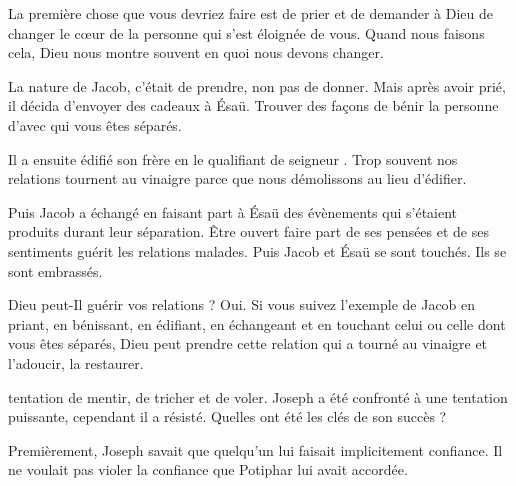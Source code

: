 
 La première chose que vous devriez faire est de prier et de demander
 à Dieu de changer le cœur de la personne qui s'est éloignée de vous.
 Quand nous faisons cela, Dieu nous montre souvent en quoi nous devons changer.

La nature de Jacob, c'était de prendre, non pas de donner.
 Mais après avoir prié, il décida d'envoyer des cadeaux à Ésaü.
 Trouver des façons de bénir la personne d'avec qui vous êtes séparés. 

Il a ensuite édifié son frère en le qualifiant de \og seigneur \fg{}.
 Trop souvent nos relations tournent au vinaigre parce que nous démolissons
 au lieu d'édifier. 

Puis Jacob a échangé en faisant part à Ésaü des évènements
 qui s'étaient produits durant leur séparation.
 Être ouvert \ocadr{}faire part de ses pensées et de ses sentiments\fcadr{}
 guérit les relations malades.
 Puis Jacob et Ésaü se sont touchés. Ils se sont embrassés. 

Dieu peut-Il guérir vos relations ? Oui. Si vous suivez l'exemple de Jacob
 \ocadr{}en priant, en bénissant, en édifiant, en échangeant et en touchant
 celui ou celle dont vous êtes séparés, Dieu peut prendre cette relation
 qui a tourné au vinaigre et l'adoucir, la restaurer. 

\dvrule






 \ocadr{}tentation de mentir, de tricher et de voler.
 Joseph a été confronté à une tentation puissante,
 cependant il a résisté.
 Quelles ont été les clés de son succès ? 

Premièrement, Joseph savait que quelqu'un lui faisait implicitement confiance.
 Il ne voulait pas violer la confiance que Potiphar lui avait accordée. 

